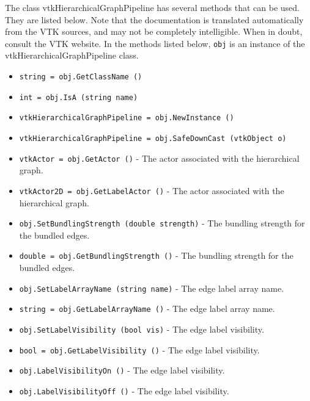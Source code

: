 The class vtkHierarchicalGraphPipeline has several methods that can be used.
  They are listed below.
Note that the documentation is translated automatically from the VTK sources,
and may not be completely intelligible.  When in doubt, consult the VTK website.
In the methods listed below, \verb|obj| is an instance of the vtkHierarchicalGraphPipeline class.
\begin{itemize}
\item  \verb|string = obj.GetClassName ()|

\item  \verb|int = obj.IsA (string name)|

\item  \verb|vtkHierarchicalGraphPipeline = obj.NewInstance ()|

\item  \verb|vtkHierarchicalGraphPipeline = obj.SafeDownCast (vtkObject o)|

\item  \verb|vtkActor = obj.GetActor ()| -  The actor associated with the hierarchical graph.

\item  \verb|vtkActor2D = obj.GetLabelActor ()| -  The actor associated with the hierarchical graph.

\item  \verb|obj.SetBundlingStrength (double strength)| -  The bundling strength for the bundled edges.

\item  \verb|double = obj.GetBundlingStrength ()| -  The bundling strength for the bundled edges.

\item  \verb|obj.SetLabelArrayName (string name)| -  The edge label array name.

\item  \verb|string = obj.GetLabelArrayName ()| -  The edge label array name.

\item  \verb|obj.SetLabelVisibility (bool vis)| -  The edge label visibility.

\item  \verb|bool = obj.GetLabelVisibility ()| -  The edge label visibility.

\item  \verb|obj.LabelVisibilityOn ()| -  The edge label visibility.

\item  \verb|obj.LabelVisibilityOff ()| -  The edge label visibility.


\end{itemize}
